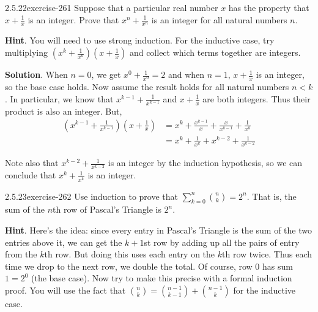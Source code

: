 \documentclass[twoside,11pt,]{book}
\numberwithin{equation}{chapter}
\renewcommand{\d}{\displaystyle}
\newcommand{\lt}{<}
\newcommand{\amp}{&}
\begin{document}
\begin{divisionsolution}{2.5.22}{}{exercise-261}%
\hypertarget{p-3679}{}%
Suppose that a particular real number \(x\) has the property that \(x + \frac{1}{x}\) is an integer. Prove that \(x^n + \frac{1}{x^n}\) is an integer for all natural numbers \(n\).%
\par\smallskip%
\noindent\textbf{Hint}.\quad%
\hypertarget{p-3680}{}%
You will need to use strong induction. For the inductive case, try multiplying \(\left (x^k + \frac{1}{x^{k}}\right)\left(x+\frac{1}{x}\right)\) and collect which terms together are integers.%
\par\smallskip%
\noindent\textbf{Solution}.\quad%
\hypertarget{p-3681}{}%
When \(n = 0\), we get \(x^0 +\frac{1}{x^0} = 2\) and when \(n = 1\), \(x + \frac{1}{x}\) is an integer, so the base case holds. Now assume the result holds for all natural numbers \(n \lt  k\). In particular, we know that \(x^{k-1} + \frac{1}{x^{k-1}}\) and \(x + \frac{1}{x}\) are both integers. Thus their product is also an integer. But,%
\begin{align*}
\left(x^{k-1} + \frac{1}{x^{k-1}}\right)\left(x + \frac{1}{x}\right) \amp = x^k + \frac{x^{k-1}}{x} + \frac{x}{x^{k-1}} + \frac{1}{x^k}\\
\amp = x^k + \frac{1}{x^k} + x^{k-2} + \frac{1}{x^{k-2}}
\end{align*}
%
\par
\hypertarget{p-3682}{}%
Note also that \(x^{k-2} + \frac{1}{x^{k-2}}\) is an integer by the induction hypothesis, so we can conclude that \(x^k + \frac{1}{x^k}\) is an integer.%
\end{divisionsolution}%
\begin{divisionsolution}{2.5.23}{}{exercise-262}%
\hypertarget{p-3683}{}%
Use induction to prove that \(\d\sum_{k=0}^n {n \choose k} = 2^n\). That is, the sum of the \(n\)th row of Pascal's Triangle is \(2^n\).%
\par\smallskip%
\noindent\textbf{Hint}.\quad%
\hypertarget{p-3684}{}%
Here's the idea: since every entry in Pascal's Triangle is the sum of the two entries above it, we can get the \(k+1\)st row by adding up all the pairs of entry from the \(k\)th row. But doing this uses each entry on the \(k\)th row twice. Thus each time we drop to the next row, we double the total. Of course, row 0 has sum \(1 = 2^0\) (the base case). Now try to make this precise with a formal induction proof. You will use the fact that \({n \choose k} = {n-1 \choose k-1} + {n-1 \choose k}\) for the inductive case.%
\end{divisionsolution}%
\end{document}

